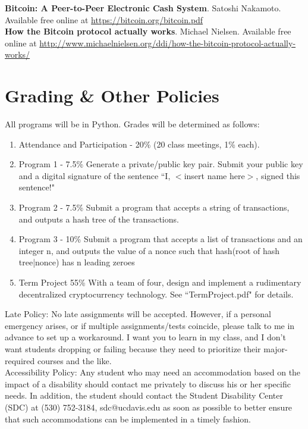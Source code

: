 \documentclass{article}
\begin{document}
\noindent \textbf{Bitcoin: A Peer-to-Peer Electronic Cash System}. Satoshi Nakamoto. Available free online at \url{https://bitcoin.org/bitcoin.pdf}\\

\noindent \textbf{How the Bitcoin protocol actually works}. Michael Nielsen. Available free online at \url{http://www.michaelnielsen.org/ddi/how-the-bitcoin-protocol-actually-works/}

\pagebreak

\section*{Grading \& Other Policies}

All programs will be in Python. Grades will be determined as follows:
\begin{enumerate}
\item Attendance and Participation - 20\% (20 class meetings, 1\% each).
\item Program 1 - 7.5\%
\subitem Generate a private/public key pair. Submit your public key and a digital signature of the sentence ``I, $<$insert name here$>$, signed this sentence!"
\item Program 2 - 7.5\%
\subitem Submit a program that accepts a string of transactions, and outputs a hash tree of the transactions.
\item Program 3 - 10\%
\subitem Submit a program that accepts a list of transactions and an integer n, and outputs the value of a nonce such that hash(root of hash tree|nonce) has n leading zeroes
\item Term Project 55\%
\subitem With a team of four, design and implement a rudimentary decentralized cryptocurrency technology. See ``TermProject.pdf" for details.

\end{enumerate}

\noindent Late Policy: No late assignments will be accepted. However, if a personal emergency arises, or if multiple assignments/tests coincide, please talk to me in advance to set up a workaround. I want you to learn in my class, and I don't want students dropping or failing because they need to prioritize their major-required courses and the like.\\

\noindent Accessibility Policy: Any student who may need an accommodation based on the impact of a disability should contact me privately to discuss his or her specific needs. In addition, the student should contact the Student Disability Center (SDC) at (530) 752-3184, sdc@ucdavis.edu as soon as possible to better ensure that such accommodations can be implemented in a timely fashion.\\
\end{document}
